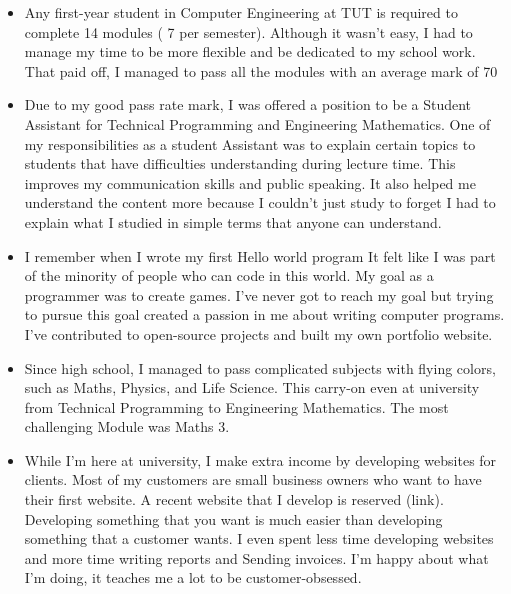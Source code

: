 \documentclass[11pt,a4paper,roman]{moderncv}        %
\begin{document}
\begin{itemize} \itemsep1em 
	\item Any first-year student in Computer Engineering at TUT is required to complete 14 modules ( 7 per semester). Although it wasn't easy, I had to manage my time to be more flexible and be dedicated to my school work. That paid off, I managed to pass all the modules with an average mark of 70%
  
	\item Due to my good pass rate mark, I was offered a position to be a Student Assistant for Technical Programming and Engineering Mathematics. One of my responsibilities as a student Assistant was to explain certain topics to students that have difficulties understanding during lecture time. This improves my communication skills and public speaking. It also helped me understand the content more because I couldn't just study to forget I had to explain what I studied in simple terms that anyone can understand.

	\item I remember when I wrote my first Hello world program It felt like I was part of the minority of people who can code in this world. My goal as a programmer was to create games. I've never got to reach my goal but trying to pursue this goal created a passion in me about writing computer programs. I've contributed to open-source projects and built my own portfolio website.

	\item Since high school, I managed to pass complicated subjects with flying colors, such as Maths, Physics, and Life Science. This carry-on even at university from Technical Programming to Engineering Mathematics. The most challenging Module was Maths 3.

	\item While I'm here at university, I make extra income by developing websites for clients. Most of my customers are small business owners who want to have their first website. A recent website that I   develop is reserved (link). Developing something that you want is much easier than developing something that a customer wants. I even spent less time developing websites and more time writing reports and Sending invoices. I'm happy about what I'm doing, it teaches me a lot to be customer-obsessed.
\end{itemize}





\makeletterclosing
\end{document}
